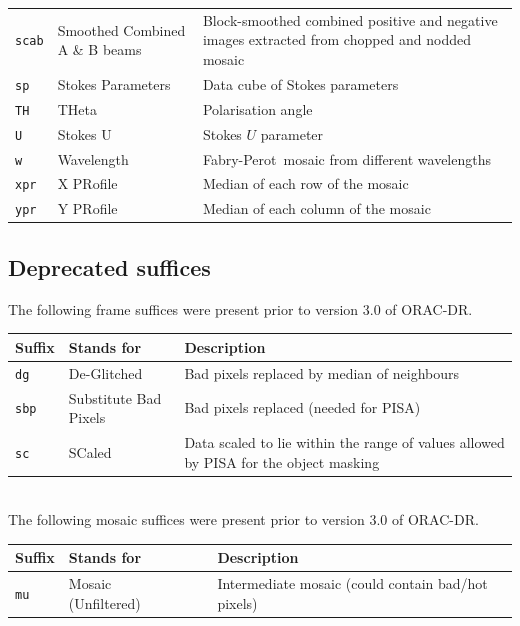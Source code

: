 \documentclass[twoside,11pt]{article}
\newcommand{\htmladdnormallink}[2]{#1}
\newcommand{\xref}[3]{#1}
\renewcommand{\_}{\texttt{\symbol{95}}}
\newcommand{\ORACDR}{{\footnotesize ORAC-DR}}
\newcommand{\PISA}{{\footnotesize PISA}}
\newcommand{\FP}{\htmladdnormallink{Fabry-Perot}{http://www.jach.hawaii.edu/JACpublic/UKIRT/instruments/ufti/ufti_fp.html}}
\begin{document}
\begin{tabular}{llp{80mm}}
{\tt\_scab} & Smoothed Combined A \& B beams & Block-smoothed combined positive and negative
                                      images extracted from chopped and nodded mosaic \\
{\tt\_sp}  & Stokes Parameters      & Data cube of Stokes parameters \\
{\tt\_TH}  & THeta                  & Polarisation angle \\
{\tt\_U}   & Stokes U               & Stokes $U$ parameter \\
{\tt\_w}   & Wavelength             & \FP\ mosaic from different wavelengths \\
{\tt\_xpr} & X PRofile              & Median of each row of the mosaic \\
{\tt\_ypr} & Y PRofile              & Median of each column of the mosaic \\
\end{tabular}

\newpage
\subsection*{Deprecated suffices}%

The following frame suffices were present prior to version 3.0 of \ORACDR.

\begin{tabular}{llp{90mm}}
\hline
  Suffix   & Stands for        & Description \\ \hline
{\tt\_dg}  & De-Glitched       & Bad pixels replaced by median of neighbours \\ 
{\tt\_sbp} & Substitute Bad Pixels & Bad pixels replaced (needed for \PISA) \\
{\tt\_sc}  & SCaled            & Data scaled to lie within the range of values
                                 allowed by \xref{\PISA}{sun109}{} for the object 
                                 masking \\
\end{tabular}
\\

The following mosaic suffices were present prior to version 3.0 of \ORACDR.

\begin{tabular}{llp{90mm}}
\hline
  Suffix   & Stands for        & Description \\ \hline
{\tt\_mu}  & Mosaic (Unfiltered)~~~ & Intermediate mosaic (could contain
                                      bad/hot pixels) \\
\end{tabular}
\end{document}
